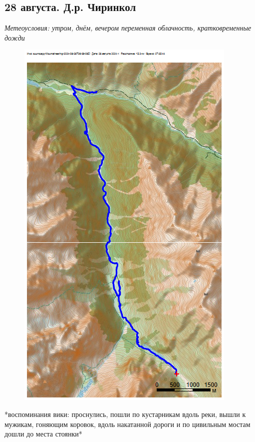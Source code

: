 \subsection{28 августа. Д.р. Чиринкол}

\textit{Метеоусловия: утром, днём, вечером переменная облачность, кратковременные дожди}

\begin{figure}[h!]
	\centering
	\includegraphics[angle=0, width=0.7\linewidth]{../pics/mini_maps/28}
	\label{fig:mini_28}
\end{figure}

*воспоминания вики: проснулись, пошли по кустарникам вдоль реки, вышли к мужикам, гоняющим коровок, вдоль накатанной дороги и по цивильным мостам дошли до места стоянки*

\clearpage